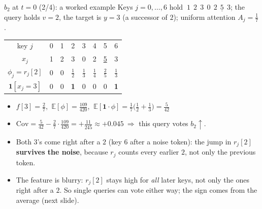 \documentclass[aspectratio=169,11pt]{beamer}
\newcommand{\1}{\mathbf{1}}
\begin{document}
\begin{frame}{$b_2$ at $t=0$ (2/4): a worked example}
\small
Keys $j=0,\dots,6$ hold $\ 1\ \ 2\ \ 3\ \ 0\ \ 2\ \ \underline{5}\ \ 3$; the query holds $v=2$, the target is $y=3$ (a successor of $2$);
uniform attention $A_j=\tfrac17$.
\begin{center}
\begin{tabular}{c|ccccccc}\toprule
key $j$ & 0&1&2&3&4&5&6\\
$x_j$ & 1&2&3&0&2&\underline5&3\\\midrule
$\phi_j=r_j[2]$ & 0&0&$\tfrac12$&$\tfrac13$&$\tfrac14$&$\tfrac25$&$\tfrac13$\\
$\1[x_j=3]$ & 0&0&\textbf1&0&0&0&\textbf1\\\bottomrule
\end{tabular}
\end{center}
\begin{itemize}
\item $f[3]=\tfrac27$, $\ \mathbb E[\phi]=\tfrac{109}{420}$, $\ \mathbb E[\1\cdot\phi]=\tfrac17\big(\tfrac12+\tfrac13\big)=\tfrac5{42}$
\item $\mathrm{Cov}=\tfrac5{42}-\tfrac27\cdot\tfrac{109}{420}=+\tfrac{11}{245}\approx+0.045\ \Rightarrow$ this query votes $b_2\uparrow$.
\item Both $3$'s come right after a $2$ (key 6 after a noise token): the jump in $r_j[2]$ \textbf{survives the noise},
because $r_j$ counts every earlier $2$, not only the previous token.
\item The feature is blurry: $r_j[2]$ stays high for \emph{all} later keys, not only the ones right after a $2$. So single
queries can vote either way; the sign comes from the average (next slide).
\end{itemize}
\end{frame}
\end{document}

